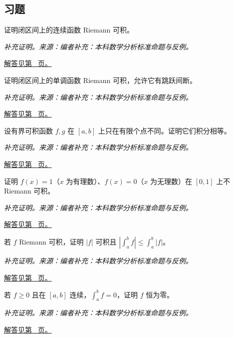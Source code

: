 \documentclass[UTF8,12pt,a4paper,fontset=fandol]{ctexart}
\begin{document}
\subsection{习题}
\begin{example}[连续函数的黎曼可积性]\label{ex:c30q1}
证明闭区间上的连续函数 Riemann 可积。
\par\textit{补充证明。来源：编者补充：本科数学分析标准命题与反例。}\par\hyperref[ans:c30q1]{解答见第~\pageref{ans:c30q1} 页。}
\end{example}
\begin{example}[单调函数的可积性]\label{ex:c30q2}
证明闭区间上的单调函数 Riemann 可积，允许它有跳跃间断。
\par\textit{补充证明。来源：编者补充：本科数学分析标准命题与反例。}\par\hyperref[ans:c30q2]{解答见第~\pageref{ans:c30q2} 页。}
\end{example}
\begin{example}[有限个点的修改不改变积分]\label{ex:c30q3}
设有界可积函数 $f,g$ 在 $[a,b]$ 上只在有限个点不同。证明它们积分相等。
\par\textit{补充证明。来源：编者补充：本科数学分析标准命题与反例。}\par\hyperref[ans:c30q3]{解答见第~\pageref{ans:c30q3} 页。}
\end{example}
\begin{example}\label{ex:c30q4}
证明 $f(x)=1$（$x$ 为有理数）、$f(x)=0$（$x$ 为无理数）在 $[0,1]$ 上不 Riemann 可积。
\par\textit{补充证明。来源：编者补充：本科数学分析标准命题与反例。}\par\hyperref[ans:c30q4]{解答见第~\pageref{ans:c30q4} 页。}
\end{example}
\begin{example}[积分绝对值不等式]\label{ex:c30q5}
若 $f$ Riemann 可积，证明 $|f|$ 可积且 $|\int_a^bf|\le\int_a^b|f|$。
\par\textit{补充证明。来源：编者补充：本科数学分析标准命题与反例。}\par\hyperref[ans:c30q5]{解答见第~\pageref{ans:c30q5} 页。}
\end{example}
\begin{example}[非负连续函数积分为零]\label{ex:c30q6}
若 $f\ge0$ 且在 $[a,b]$ 连续，$\int_a^bf=0$，证明 $f$ 恒为零。
\par\textit{补充证明。来源：编者补充：本科数学分析标准命题与反例。}\par\hyperref[ans:c30q6]{解答见第~\pageref{ans:c30q6} 页。}
\end{example}
\end{document}
